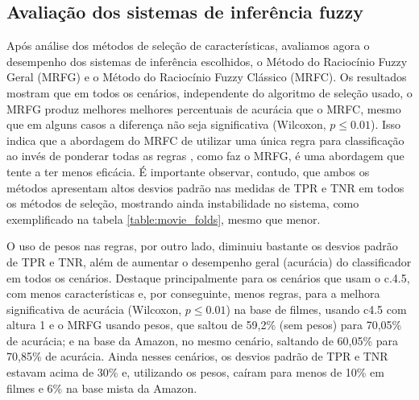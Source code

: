 \documentclass[template.tex]{subfiles}
\begin{document}
%
%
%


\subsection{Avaliação dos sistemas de inferência fuzzy}

Após análise dos métodos de seleção de características, avaliamos agora o desempenho dos sistemas de inferência escolhidos, o Método do Raciocínio Fuzzy Geral (MRFG) e o Método do Raciocínio Fuzzy Clássico (MRFC). Os resultados mostram que em todos os cenários, independente do algoritmo de seleção usado, o MRFG produz melhores melhores percentuais de acurácia que o MRFC, mesmo que em alguns casos a diferença não seja significativa (Wilcoxon, $p\leq0.01$). Isso indica que a abordagem do MRFC de utilizar uma única regra para classificação ao invés de ponderar todas as regras , como faz o MRFG, é uma abordagem que tente a ter menos eficácia. É importante observar, contudo, que ambos os métodos apresentam altos desvios padrão nas medidas de TPR e TNR em todos os métodos de seleção, mostrando ainda instabilidade no sistema, como exemplificado na tabela \ref{table:movie_folds}, mesmo que menor. 

O uso de pesos nas regras, por outro lado, diminuiu bastante os desvios padrão de TPR e TNR, além de aumentar o desempenho geral (acurácia) do classificador em todos os cenários. Destaque principalmente para os cenários que usam o c.4.5, com menos características e, por conseguinte, menos regras, para a melhora significativa de acurácia (Wilcoxon, $p\leq0.01$) na base de filmes, usando c4.5 com altura 1 e o MRFG usando pesos, que saltou de 59,2\% (sem pesos) para 70,05\% de acurácia; e na base da Amazon, no mesmo cenário, saltando de 60,05\% para 70,85\% de acurácia. Ainda nesses cenários, os desvios padrão de TPR e TNR estavam acima de 30\% e, utilizando os pesos, caíram para menos de 10\% em filmes e 6\% na base mista da Amazon.
\end{document}
